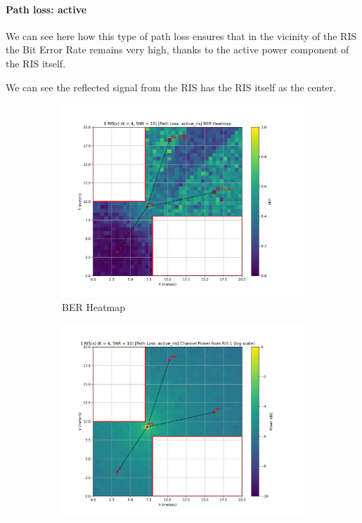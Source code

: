 \paragraph*{Path loss: active}

We can see here how this type of path loss ensures that in the vicinity of the RIS the Bit Error Rate remains very high, thanks to the active power component of the RIS itself.

We can see the reflected signal from the RIS has the RIS itself as the center.

\begin{figure}[H]
  \centering
  \begin{subfigure}[b]{0.48\textwidth}
    \centering
    \includegraphics[width=\textwidth]{imgs/heatmap-simulations/1 RIS(s) (K = 4, SNR = 10) [Path Loss_ active_ris] BER Heatmap.png}
    \caption{BER Heatmap}
  \end{subfigure}
  \hfill
  \begin{subfigure}[b]{0.48\textwidth}
    \centering
    \includegraphics[width=\textwidth]{imgs/heatmap-simulations/1 RIS(s) (K = 4, SNR = 10) [Path Loss_ active_ris] Channel Power from RIS 1 (log scale).png}

\end{subfigure}
\end{figure}
